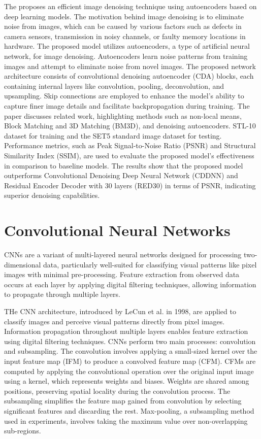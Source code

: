 The \citep{bajaj2020autoencoders} proposes an efficient image denoising technique using autoencoders based on deep learning models. The motivation behind image denoising is to eliminate noise from images, which can be caused by various factors such as defects in camera sensors, transmission in noisy channels, or faulty memory locations in hardware. The proposed model utilizes autoencoders, a type of artificial neural network, for image denoising. Autoencoders learn noise patterns from training images and attempt to eliminate noise from novel images. The proposed network architecture consists of convolutional denoising autoencoder (CDA) blocks, each containing internal layers like convolution, pooling, deconvolution, and upsampling. Skip connections are employed to enhance the model's ability to capture finer image details and facilitate backpropagation during training. The paper discusses related work, highlighting methods such as non-local means, Block Matching and 3D Matching (BM3D), and denoising autoencoders. STL-10 dataset for training and the SET5 standard image dataset for testing. Performance metrics, such as Peak Signal-to-Noise Ratio (PSNR) and Structural Similarity Index (SSIM), are used to evaluate the proposed model's effectiveness in comparison to baseline models. The results show that the proposed model outperforms Convolutional Denoising Deep Neural Network (CDDNN) and Residual Encoder Decoder with 30 layers (RED30) in terms of PSNR, indicating superior denoising capabilities.

\section{Convolutional Neural Networks}
CNNs are a variant of multi-layered neural networks designed for
processing two-dimensional data, particularly well-suited for classifying visual patterns like pixel images with minimal pre-processing.
Feature extraction from observed data occurs at each layer by 
applying digital filtering techniques, allowing information to propagate through multiple layers.

THe CNN architecture, introduced by LeCun et al. in 1998, are
applied to classify images and perceive visual patterns directly
from pixel images. Information propagation throughout multiple layers
enables feature extraction using digital filtering techniques.
CNNs perform two main processes: convolution and subsampling. 
The convolution involves applying a small-sized kernel over the input
feature map (IFM) to produce a convolved feature map (CFM). CFMs are
computed by applying the convolutional operation over the original
input image using a kernel, which represents weights and biases.
Weights are shared among positions, preserving spatial locality during
the convolution process. The subsampling simplifies the feature map 
gained from convolution by selecting significant features and 
discarding the rest. Max-pooling, a subsampling method used in 
experiments, involves taking the maximum value over non-overlapping
sub-regions.

